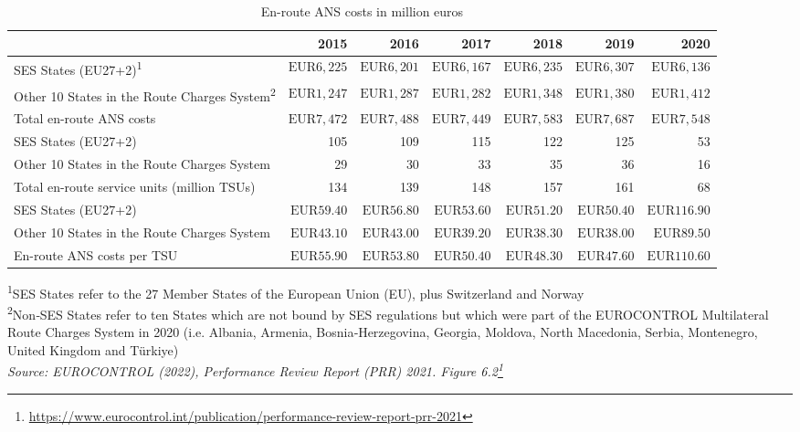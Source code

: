 \documentclass[
  11pt,
  a4paper,
]{book}
\DeclareRobustCommand{\href}[2]{#2\footnote{\url{#1}}}
\begin{document}
\hypertarget{tbl-ans-costs}{}
\setlength{\LTpost}{0mm}
\begin{longtable}{lrrrrrr}
\caption{\label{tbl-ans-costs}En-route ANS costs in million euros }\tabularnewline

\toprule
  & 2015 & 2016 & 2017 & 2018 & 2019 & 2020 \\ 
\midrule
SES States (EU27+2)\textsuperscript{1} & $\text{EUR}6,225$ & $\text{EUR}6,201$ & $\text{EUR}6,167$ & $\text{EUR}6,235$ & $\text{EUR}6,307$ & $\text{EUR}6,136$ \\ 
Other 10 States in the Route Charges System\textsuperscript{2} & $\text{EUR}1,247$ & $\text{EUR}1,287$ & $\text{EUR}1,282$ & $\text{EUR}1,348$ & $\text{EUR}1,380$ & $\text{EUR}1,412$ \\ 
Total en-route ANS costs & $\text{EUR}7,472$ & $\text{EUR}7,488$ & $\text{EUR}7,449$ & $\text{EUR}7,583$ & $\text{EUR}7,687$ & $\text{EUR}7,548$ \\ 
SES States (EU27+2) & 105 & 109 & 115 & 122 & 125 & 53 \\ 
Other 10 States in the Route Charges System & 29 & 30 & 33 & 35 & 36 & 16 \\ 
Total en-route service units (million TSUs) & 134 & 139 & 148 & 157 & 161 & 68 \\ 
SES States (EU27+2) & $\text{EUR}59.40$ & $\text{EUR}56.80$ & $\text{EUR}53.60$ & $\text{EUR}51.20$ & $\text{EUR}50.40$ & $\text{EUR}116.90$ \\ 
Other 10 States in the Route Charges System & $\text{EUR}43.10$ & $\text{EUR}43.00$ & $\text{EUR}39.20$ & $\text{EUR}38.30$ & $\text{EUR}38.00$ & $\text{EUR}89.50$ \\ 
En-route ANS costs per TSU & $\text{EUR}55.90$ & $\text{EUR}53.80$ & $\text{EUR}50.40$ & $\text{EUR}48.30$ & $\text{EUR}47.60$ & $\text{EUR}110.60$ \\ 
\bottomrule
\end{longtable}
\begin{minipage}{\linewidth}
\textsuperscript{1}SES States refer  to  the  27  Member  States  of  the European  Union  (EU),  plus  Switzerland and Norway\\
\textsuperscript{2}Non‐SES States refer to ten States which are not bound by SES regulations but which were part of the EUROCONTROL Multilateral Route Charges System in 2020 (i.e. Albania, Armenia, Bosnia‐Herzegovina, Georgia, Moldova, North Macedonia, Serbia, Montenegro, United Kingdom and Türkiye)\\
\emph{Source: \href{https://www.eurocontrol.int/publication/performance-review-report-prr-2021}{EUROCONTROL (2022), Performance Review Report (PRR) 2021. Figure 6.2}}\\
\end{minipage}
\end{document}
